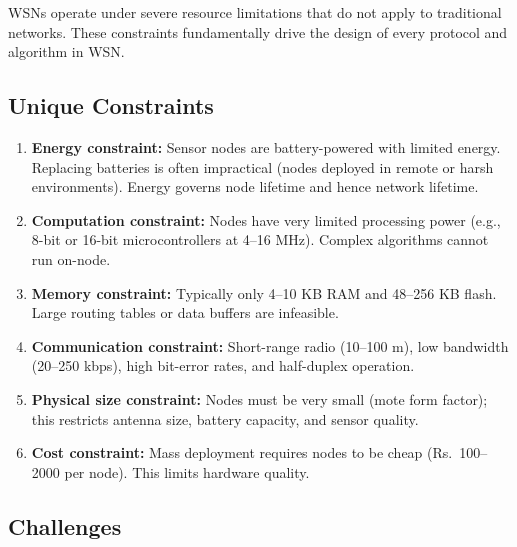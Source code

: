 \documentclass[12pt,a4paper]{article}
\begin{document}
WSNs operate under severe resource limitations that do not apply to traditional networks. These constraints fundamentally drive the design of every protocol and algorithm in WSN.

\subsection{Unique Constraints}

\begin{tcolorbox}[formulabox, title={\textbf{Key Constraints of WSN}}]
\begin{enumerate}[leftmargin=*, itemsep=4pt]
  \item \textbf{Energy constraint:} Sensor nodes are battery-powered with limited energy. Replacing batteries is often impractical (nodes deployed in remote or harsh environments). Energy governs node lifetime and hence network lifetime.
  \item \textbf{Computation constraint:} Nodes have very limited processing power (e.g., 8-bit or 16-bit microcontrollers at 4--16 MHz). Complex algorithms cannot run on-node.
  \item \textbf{Memory constraint:} Typically only 4--10 KB RAM and 48--256 KB flash. Large routing tables or data buffers are infeasible.
  \item \textbf{Communication constraint:} Short-range radio (10--100 m), low bandwidth (20--250 kbps), high bit-error rates, and half-duplex operation.
  \item \textbf{Physical size constraint:} Nodes must be very small (mote form factor); this restricts antenna size, battery capacity, and sensor quality.
  \item \textbf{Cost constraint:} Mass deployment requires nodes to be cheap (Rs.~100--2000 per node). This limits hardware quality.
\end{enumerate}
\end{tcolorbox}

\subsection{Challenges}
\end{document}
